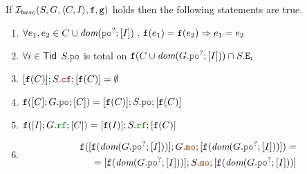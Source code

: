 \documentclass[12pt]{article}
\begin{document}
\begin{prop}
  If $\mathcal{I}_{base}(S, G, \langle C, I \rangle, {\mathtt{f}}, {\mathtt{g}})$ holds then the following statements are true.
  \begin{enumerate}[label=\textbf{P.1.\arabic*.},align=left]

    \item \label{item:sim-finj-ext}
    $\forall{e_1, e_2 \in C \cup \dom{\lPO^?;[I]}} ~.~ \f(e_1) = \f(e_2) \Rightarrow e_1 = e_2$
        
    \item \label{item:sim-po-tot-ext}
    $\forall{i \in \mathsf{Tid}}$
    $S.\lPO$ is total on $\f(C \cup \dom{G.\lPO^?;[I]}) \cap S.\lEi{i}$

    \item \label{item:sim-ncf}
    $[\f(C)];S.\lCF;[\f(C)] = \emptyset$
    
    \item \label{item:sim-po-eq}
    $\f([C];G.\lPO;[C]) = [\f(C)];S.\lPO;[\f(C)]$

    \item \label{item:sim-rf-eq}
    $\f([I];G.\lRF;[C]) = [\f(I)];S.\lRF;[\f(C)]$
    
    \item \label{item:sim-mo-eq}
    \begin{equation*}
      \begin{split}
        \f([\f(\dom{G.\lPO^?;[I]})];G.\lMO;[\f(\dom{G.\lPO^?;[I]})]) = \\
        = [\f(\dom{G.\lPO^?;[I]})];S.\lMO;[\f(\dom{G.\lPO^?;[I]})]
      \end{split}
    \end{equation*}
    
  \end{enumerate}
\end{prop}



\end{document}
